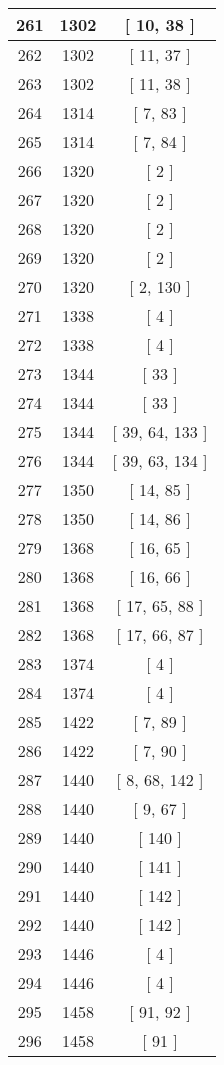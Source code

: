 \begin{center}
\begin{longtable}[H]{|| c c c ||}
\\\hline
261 & 1302 & [ 10, 38 ]
\\\hline
262 & 1302 & [ 11, 37 ]
\\\hline
263 & 1302 & [ 11, 38 ]
\\\hline
264 & 1314 & [ 7, 83 ]
\\\hline
265 & 1314 & [ 7, 84 ]
\\\hline
266 & 1320 & [ 2 ]
\\\hline
267 & 1320 & [ 2 ]
\\\hline
268 & 1320 & [ 2 ]
\\\hline
269 & 1320 & [ 2 ]
\\\hline
270 & 1320 & [ 2, 130 ]
\\\hline
271 & 1338 & [ 4 ]
\\\hline
272 & 1338 & [ 4 ]
\\\hline
273 & 1344 & [ 33 ]
\\\hline
274 & 1344 & [ 33 ]
\\\hline
275 & 1344 & [ 39, 64, 133 ]
\\\hline
276 & 1344 & [ 39, 63, 134 ]
\\\hline
277 & 1350 & [ 14, 85 ]
\\\hline
278 & 1350 & [ 14, 86 ]
\\\hline
279 & 1368 & [ 16, 65 ]
\\\hline
280 & 1368 & [ 16, 66 ]
\\\hline
281 & 1368 & [ 17, 65, 88 ]
\\\hline
282 & 1368 & [ 17, 66, 87 ]
\\\hline
283 & 1374 & [ 4 ]
\\\hline
284 & 1374 & [ 4 ]
\\\hline
285 & 1422 & [ 7, 89 ]
\\\hline
286 & 1422 & [ 7, 90 ]
\\\hline
287 & 1440 & [ 8, 68, 142 ]
\\\hline
288 & 1440 & [ 9, 67 ]
\\\hline
289 & 1440 & [ 140 ]
\\\hline
290 & 1440 & [ 141 ]
\\\hline
291 & 1440 & [ 142 ]
\\\hline
292 & 1440 & [ 142 ]
\\\hline
293 & 1446 & [ 4 ]
\\\hline
294 & 1446 & [ 4 ]
\\\hline
295 & 1458 & [ 91, 92 ]
\\\hline
296 & 1458 & [ 91 ]
\\\hline

\end{longtable}
\end{center}
